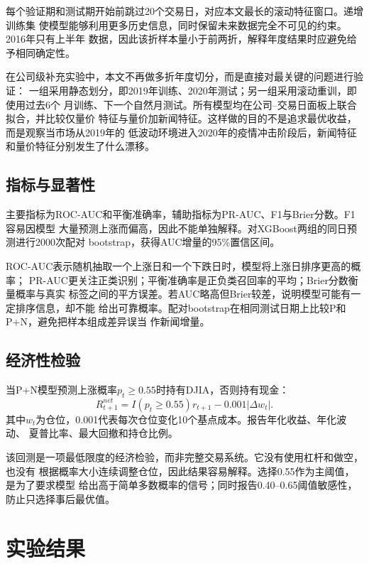 \documentclass[UTF8,a4paper,10pt,twocolumn,fontset=none]{ctexart}
\begin{document}
每个验证期和测试期开始前跳过20个交易日，对应本文最长的滚动特征窗口。递增训练集
使模型能够利用更多历史信息，同时保留未来数据完全不可见的约束。2016年只有上半年
数据，因此该折样本量小于前两折，解释年度结果时应避免给予相同确定性。

在公司级补充实验中，本文不再做多折年度切分，而是直接对最关键的问题进行验证：
一组采用静态划分，即2019年训练、2020年测试；另一组采用滚动重训，即使用过去6个
月训练、下一个自然月测试。所有模型均在公司--交易日面板上联合拟合，并比较仅量价
特征与量价加新闻特征。这样做的目的不是追求最优收益，而是观察当市场从2019年的
低波动环境进入2020年的疫情冲击阶段后，新闻特征和量价特征分别发生了什么漂移。

\subsection{指标与显著性}

主要指标为ROC-AUC和平衡准确率，辅助指标为PR-AUC、F1与Brier分数。F1容易因模型
大量预测上涨而偏高，因此不能单独解释。对XGBoost两组的同日预测进行2000次配对
bootstrap，获得AUC增量的95\%置信区间。

ROC-AUC表示随机抽取一个上涨日和一个下跌日时，模型将上涨日排序更高的概率；
PR-AUC更关注正类识别；平衡准确率是正负类召回率的平均；Brier分数衡量概率与真实
标签之间的平方误差。若AUC略高但Brier较差，说明模型可能有一定排序信息，却不能
给出可靠概率。配对bootstrap在相同测试日期上比较P和P+N，避免把样本组成差异误当
作新闻增量。

\subsection{经济性检验}

当P+N模型预测上涨概率$p_t\geq0.55$时持有DJIA，否则持有现金：
\begin{equation}
R_{t+1}^{net}=I(p_t\geq0.55)r_{t+1}-0.001|\Delta w_t|.
\end{equation}
其中$w_t$为仓位，0.001代表每次仓位变化10个基点成本。报告年化收益、年化波动、
夏普比率、最大回撤和持仓比例。

该回测是一项最低限度的经济检验，而非完整交易系统。它没有使用杠杆和做空，也没有
根据概率大小连续调整仓位，因此结果容易解释。选择0.55作为主阈值，是为了要求模型
给出高于简单多数概率的信号；同时报告0.40--0.65阈值敏感性，防止只选择事后最优值。

\section{实验结果}
\end{document}
